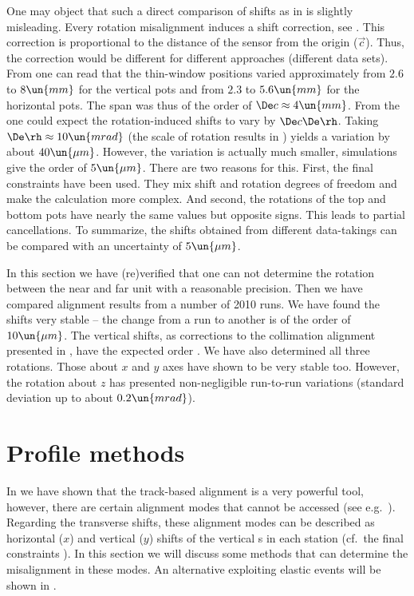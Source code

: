 One may object that such a direct comparison of shifts as in  is slightly misleading. Every rotation misalignment induces a shift correction, see . This correction is proportional to the distance of the sensor from the origin ($\vec c$). Thus, the correction would be different for different  approaches (different data sets). From  one can read that the thin-window positions varied approximately from $2.6$ to $8\un{mm}$ for the vertical pots and from $2.3$ to $5.6\un{mm}$ for the horizontal pots. The span was thus of the order of $\De c \approx 4\un{mm}$. From the  one could expect the rotation-induced shifts to vary by $\De c \De \rh$. Taking $\De\rh \approx 10 \un{mrad}$ (the scale of rotation results in ) yields a variation by about $40\un{\mu m}$. However, the variation is actually much smaller,  simulations give the order of $5\un{\mu m}$. There are two reasons for this. First, the final constraints have been used. They mix shift and rotation degrees of freedom and make the calculation more complex. And second, the rotations of the top and bottom pots have nearly the same values but opposite signs. This leads to partial cancellations. To summarize, the shifts obtained from different data-takings can be compared with an uncertainty of $5\un{\mu m}$.


In this section we have (re)verified that one can not determine the rotation between the near and far unit with a reasonable precision. Then we have compared alignment results from a number of 2010  runs. We have found the  shifts very stable -- the change from a run to another is of the order of $10\un{\mu m}$. The vertical  shifts, as corrections to the collimation alignment presented in , have the expected order . We have also determined all three  rotations. Those about $x$ and $y$ axes have shown to be very stable too. However, the rotation about $z$ has presented non-negligible run-to-run variations (standard deviation up to about $0.2\un{mrad}$).


\section[al prof]{Profile methods}

In  we have shown that the track-based alignment is a very powerful tool, however, there are certain alignment modes that cannot be accessed (see e.g.~). Regarding the transverse shifts, these alignment modes can be described as horizontal ($x$) and vertical ($y$) shifts of the vertical s in each station (cf.~the final constraints ). In this section we will discuss some methods that can determine the misalignment in these modes. An alternative exploiting elastic events will be shown in .

